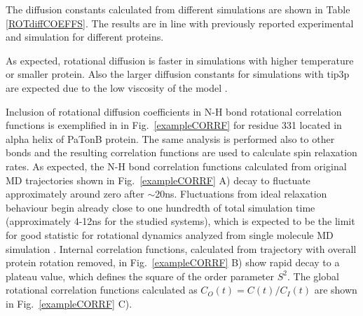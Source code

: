 \documentclass[pre,aps,floatfix,authordate1-4,twocolumn]{revtex4-1}
\begin{document}
The diffusion constants calculated from different simulations are
shown in Table \ref{ROTdiffCOEFFS}. The results are in line with
previously reported experimental and simulation for different proteins.

As expected,
rotational diffusion is faster in simulations with higher temperature
or smaller protein. Also the larger diffusion constants for simulations
with tip3p are expected due to the low viscosity of the model \cite{??}.

Inclusion of rotational diffusion coefficients in N-H bond
rotational correlation functions is exemplified in in Fig.~\ref{exampleCORRF}
for residue 331 located in alpha helix of PaTonB protein. 
The same analysis is performed also to other bonds and the resulting
correlation functions are used to calculate spin relaxation rates.
As expected, the N-H bond correlation functions calculated from original MD trajectories
shown in Fig.~\ref{exampleCORRF} A)  decay to fluctuate approximately around zero
after $\sim$20ns. Fluctuations from
ideal relaxation behaviour begin already close to one
hundredth of total simulation time (approximately 4-12ns for the studied systems),
which is expected to be the limit for good
statistic for rotational dynamics analyzed from single molecule MD simulation \cite{??}.
Internal correlation functions, calculated from trajectory with overall protein rotation removed,
in Fig.~\ref{exampleCORRF} B) show rapid decay to a plateau value, which defines the square of the order
parameter $S^2$. The global rotational correlation functions calculated as $C_O(t)=C(t)/C_I(t)$
are shown in Fig.~\ref{exampleCORRF} C). 
\end{document}
